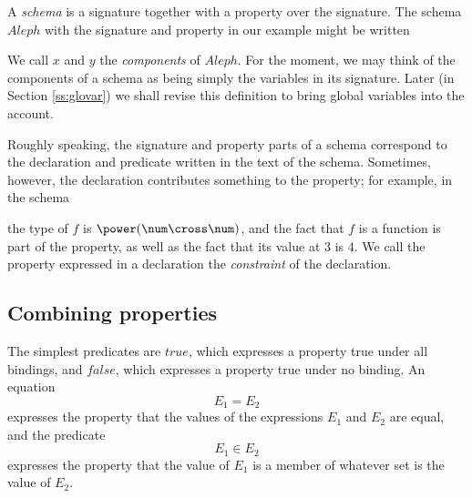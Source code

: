 A {\em schema\/}%
is a signature together with a property over the signature.  The
schema $Aleph$ with the signature and property in our example might
be written
We call $x$ and $y$ the {\em components\/}%
%
of $Aleph$. For the moment, we may think of the components of a schema
as being simply the variables in its signature. Later (in Section
\ref{ss:glovar}) we shall revise this definition to bring global
variables into the account.

Roughly speaking, the signature and property parts of a schema
correspond to the declaration and predicate written in the text of
the schema. Sometimes, however, the declaration contributes something to the property; for
example, in the schema
the type of $f$ is $\power(\num \cross \num)$, and the fact that
$f$ is a function is part of the property, as well as the fact
that its value at $3$ is 4. We call the property expressed in a
declaration the {\em constraint\/}%
of the declaration.

\subsection{Combining properties}

The simplest predicates are $true$, which expresses a
property true under all bindings, and $false$, which
expresses a property true under no binding.  An
equation
\[ E_1 = E_2 \]
expresses the property that the values of the expressions $E_1$
and $E_2$ are equal, and the predicate
\[ E_1 \in E_2 \]
expresses the property that the value of $E_1$ is a member of whatever set
is the value of $E_2$.

